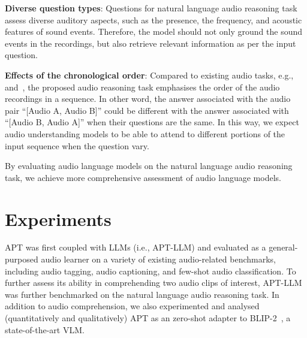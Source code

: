 \documentclass{article} %
\begin{document}
\textbf{Diverse question types}: Questions for natural language audio reasoning task assess diverse auditory aspects, such as the presence, the frequency, and acoustic features of sound events. Therefore, the model should not only ground the sound events in the recordings, but also retrieve relevant information as per the input question. 

\textbf{Effects of the chronological order}: Compared to existing audio tasks, e.g.,~\citep{li_blip-2_2023} and~\citep{gong_listen_2023}, the proposed audio reasoning task emphasises the order of the audio recordings in a sequence. In other word, the answer associated with the audio pair ``[Audio A, Audio B]'' could be different with the answer associated with  ``[Audio B, Audio A]'' when their questions are the same. In this way, we expect audio understanding models to be able to attend to different portions of the input sequence when the question vary. 

By evaluating audio language models on the natural language audio reasoning task, we achieve more comprehensive assessment of audio language models.

\section{Experiments} \label{sec:experiments}
APT was first coupled with LLMs (i.e., APT-LLM) and evaluated as a general-purposed audio learner on a variety of existing audio-related benchmarks, including audio tagging, audio captioning, and few-shot audio classification. To further assess its ability in comprehending two audio clips of interest, APT-LLM was further benchmarked on the natural language audio reasoning task. In addition to audio comprehension, we also experimented and analysed (quantitatively and qualitatively) APT as an zero-shot adapter to BLIP-2~\citep{li_blip-2_2023,dai_instructblip_2023}, a state-of-the-art VLM.
\end{document}
